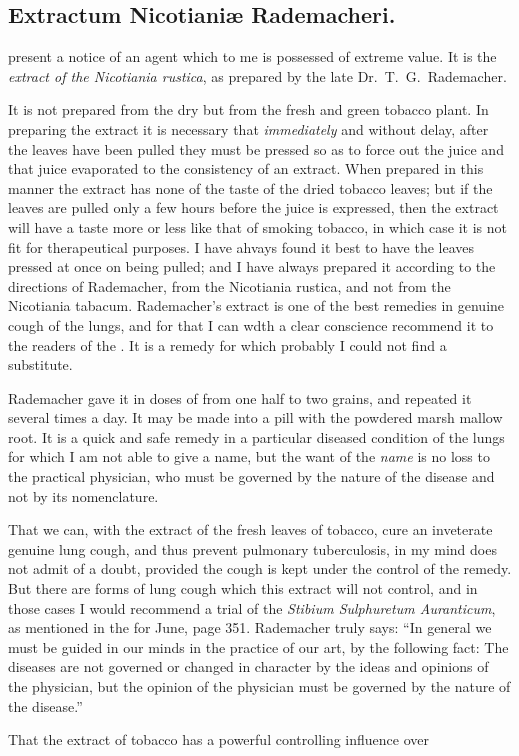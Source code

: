 \subsection*{Extractum Nicotianiæ Rademacheri.}


 present a notice of an agent which to me is possessed of
extreme value. It is the \emph{extract of the Nicotiania rustica}, as prepared
by the late Dr.~T.~G.\ Rademacher.

It is not prepared from the dry but from the fresh and green tobacco
plant. In preparing the extract it is necessary that \emph{immediately} and
without delay, after the leaves have been pulled they must be pressed
so as to force out the juice and that juice evaporated to the consistency
of an extract. When prepared in this manner the extract has none of
the taste of the dried tobacco leaves; but if the leaves are pulled only
a few hours before the juice is expressed, then the extract will have a
taste more or less like that of smoking tobacco, in which case it is not
fit for therapeutical purposes. I have ahvays found it best to have the
leaves pressed at once on being pulled; and I have always prepared it
according to the directions of Rademacher, from the Nicotiania rustica,
and not from the Nicotiania tabacum. Rademacher's extract is one of
the best remedies in genuine cough of the lungs, and for that I can wdth
a clear conscience recommend it to the readers of the .
It is a remedy for which probably I could not find a substitute.

Rademacher gave it in doses of from one half to two grains, and repeated
it several times a day. It may be made into a pill with the
powdered marsh mallow root. It is a quick and safe remedy in a particular
diseased condition of the lungs for which I am not able to give
a name, but the want of the \emph{name} is no loss to the practical physician,
who must be governed by the nature of the disease and not by its
nomenclature.

That we can, with the extract of the fresh leaves of tobacco, cure an
inveterate genuine lung cough, and thus prevent pulmonary tuberculosis,
in my mind does not admit of a doubt, provided the cough is kept under
the control of the remedy. But there are forms of lung cough which
this extract will not control, and in those cases I would recommend a
trial of the \emph{Stibium Sulphuretum Auranticum}, as mentioned in the
 for June, page 351. Rademacher truly says: ``In
general we must be guided in our minds in the practice of our art, by
the following fact: The diseases are not governed or changed in character
by the ideas and opinions of the physician, but the opinion of
the physician must be governed by the nature of the disease.''

That the extract of tobacco has a powerful controlling influence over\endinput
